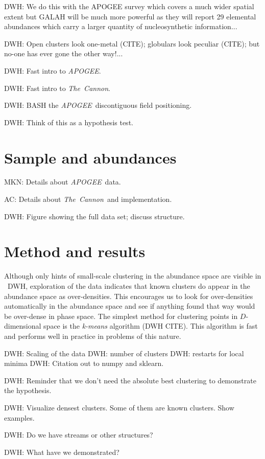 \documentclass[12pt, letterpaper, preprint]{aastex}
\newcommand{\acronym}[1]{{\small{#1}}}
\newcommand{\project}[1]{\textsl{#1}}
\newcommand{\apogee}{\acronym{\project{APOGEE}}}
\newcommand{\thecannon}{\project{The~Cannon}}
\begin{document}
DWH: We do this with the APOGEE survey which covers a much wider
spatial extent but GALAH will be much more powerful as they will
report 29 elemental abundances which carry a larger quantity of
nucleosynthetic information...

DWH: Open clusters look one-metal (CITE); globulars look peculiar
(CITE); but no-one has ever gone the other way!...

DWH: Fast intro to \apogee.

DWH: Fast intro to \thecannon.

DWH: BASH the \apogee\ discontiguous field positioning.

DWH: Think of this as a hypothesis test.

\section{Sample and abundances}

MKN: Details about \apogee\ data.

AC: Details about \thecannon\ and implementation.

DWH: Figure showing the full data set; discuss structure.

\section{Method and results}

Although only hints of small-scale clustering in the abundance space
are visible in \figurename~DWH, exploration of the data indicates that
known clusters do appear in the abundance space as over-densities.
This encourages us to look for over-densities automatically in the
abundance space and see if anything found that way would be over-dense
in phase space.
The simplest method for clustering points in $D$-dimensional space is
the \emph{k-means} algorithm (DWH CITE).
This algorithm is fast and performs well in practice in problems of
this nature.

DWH: Scaling of the data
DWH: number of clusters
DWH: restarts for local minima
DWH: Citation out to numpy and sklearn.

DWH: Reminder that we don't need the absolute best clustering to
demonstrate the hypothesis.

DWH: Visualize densest clusters.  Some of them are known clusters.
Show examples.

DWH: Do we have streams or other structures?

DWH: What have we demonstrated?
\end{document}
